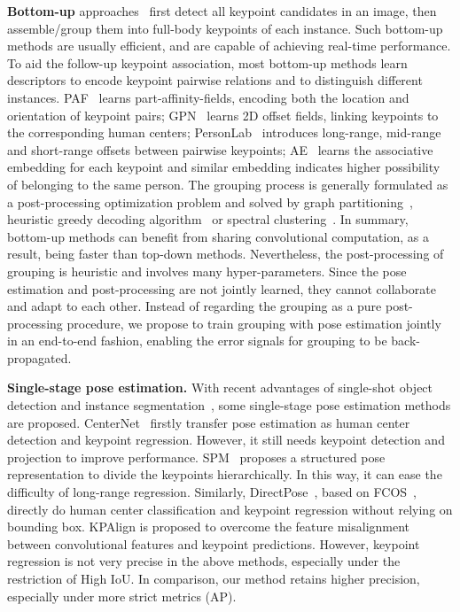 \documentclass[runningheads]{llncs}
\begin{document}
	\textbf{Bottom-up} approaches~\cite{cao2017realtime,Insafutdinov2016ArtTrack,Insafutdinov2016DeeperCut,Iqbal2016PoseTrack,jin2019multi,jin2017towards,newell2017associative,nie2017generative,papandreou2018personlab,pishchulin2016deepcut} first detect all keypoint candidates in an image, then assemble/group them into full-body keypoints of each instance. Such bottom-up methods are usually efficient, and are capable of achieving real-time performance. To aid the follow-up keypoint association, most bottom-up methods learn descriptors to encode keypoint pairwise relations and to distinguish different instances. PAF~\cite{cao2017realtime} learns part-affinity-fields, encoding both the location and orientation of keypoint pairs; GPN~\cite{nie2017generative} learns 2D offset fields, linking keypoints to the corresponding human centers; PersonLab~\cite{papandreou2018personlab} introduces long-range, mid-range and short-range offsets between pairwise keypoints; AE~\cite{newell2017associative} learns the associative embedding for each keypoint and similar embedding indicates higher possibility of belonging to the same person. The grouping process is generally formulated as a post-processing optimization problem and solved by graph partitioning~\cite{Insafutdinov2016ArtTrack,Insafutdinov2016DeeperCut,Iqbal2016PoseTrack,pishchulin2016deepcut}, heuristic greedy decoding algorithm~\cite{cao2017realtime,papandreou2018personlab} or spectral clustering~\cite{nie2017generative}.
	In summary, bottom-up methods can benefit from sharing convolutional computation, as a result, being faster than top-down methods. Nevertheless, the post-processing of grouping is heuristic and involves many hyper-parameters. Since the pose estimation and post-processing are not jointly learned, they cannot collaborate and adapt to each other.
	Instead of regarding the grouping as a pure post-processing procedure, we propose to train grouping with pose estimation jointly in an end-to-end fashion, enabling the error signals for grouping to be back-propagated.
	
	\textbf{Single-stage pose estimation.}
	With recent advantages of single-shot object detection and instance segmentation~\cite{tian2019fcos,xie2019polarmask,zhou2019objects}, some single-stage pose estimation methods are proposed. CenterNet~\cite{zhou2019objects} firstly transfer pose estimation as human center detection and keypoint regression. However, it still needs keypoint detection and projection to improve performance.
	SPM~\cite{nie2019single} proposes a structured pose representation to divide the keypoints hierarchically. In this way, it can ease the difficulty of long-range regression. 
	Similarly, DirectPose~\cite{tian2019directpose}, based on FCOS~\cite{tian2019fcos}, directly do human center classification and keypoint regression without relying on bounding box. KPAlign is proposed to overcome the feature misalignment between convolutional features and keypoint predictions.
	However, keypoint regression is not very precise in the above methods, especially under the restriction of High IoU. In comparison, our method retains higher precision, especially under more strict metrics (AP).
	
\end{document}
